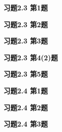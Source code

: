 \renewcommand{\newpageorvspace}{\vspace{2em}}

\date{第四次作业}



\maketitle


{\bf 习题2.3 第1题}

\newpageorvspace

{\bf 习题2.3 第2题}

\newpageorvspace

{\bf 习题2.3 第3题}

\newpageorvspace

{\bf 习题2.3 第4(2)题}

\newpageorvspace

{\bf 习题2.3 第5题}

\newpageorvspace

{\bf 习题2.4 第1题}

\newpageorvspace

{\bf 习题2.4 第2题}

\newpageorvspace

{\bf 习题2.4 第3题}


